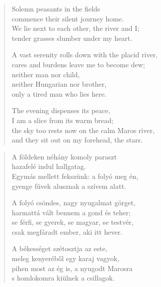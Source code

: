\documentclass[11pt]{book}
\newcommand*{\centeredornament}{\centerline{\pgfornament[width=6cm]{88}}}
\begin{document}
\begin{verse}
  Solemn peasants in the fields \\
  commence their silent journey home. \\
  We lie next to each other, the river and I; \\
  tender grasses slumber under my heart.

  A vast serenity rolls down with the placid river,\hspace*{-2mm} \\
  cares and burdens leave me to become dew; \\
  neither man nor child, \\
  neither Hungarian nor brother, \\
  only a tired man who lies here.

  The evening dispenses its peace, \\
  I am a slice from its warm bread; \\
  the sky too rests now on the calm Maros river,\hspace*{-1mm} \\
  and they sit out on my forehead, the stars.
\end{verse}

\newpage

\vspace*{-15mm}
\centeredornament



\begin{verse}
  A földeken néhány komoly paraszt \\
  hazafelé indul hallgatag. \\
  Egymás mellett fekszünk: a folyó meg én, \\
  gyenge füvek alusznak a szívem alatt.

  A folyó csöndes, nagy nyugalmat görget, \\
  harmattá vált bennem a gond és teher; \\
  se férfi, se gyerek, se magyar, se testvér, \\
  csak megfáradt ember, aki itt hever.

  A békességet szétosztja az este, \\
  meleg kenyeréből egy karaj vagyok, \\
  pihen most az ég is, a nyugodt Marosra \\
  s homlokomra kiülnek a csillagok.
\end{verse}
\end{document}
